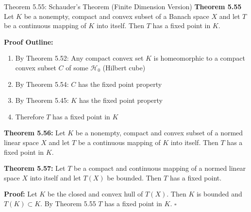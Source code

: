 \documentclass[aspectratio=169,10pt]{beamer}
\begin{document}
\begin{frame}[allowframebreaks]{Theorem 5.55: Schauder's Theorem (Finite Dimension Version)}
    \textbf{Theorem 5.55} Let $K$ be a nonempty, compact and convex subset of a Banach space $X$ and let $T$ be a continuous mapping of $K$ into itself. Then $T$ has a fixed point in $K$.

    \vspace{0.4cm}
    \textbf{Proof Outline:}

    \begin{enumerate}
        \item By Theorem 5.52: Any compact convex set $K$ is homeomorphic to a compact convex subset $C$ of some $\mathcal{H}_0$ (Hilbert cube)

        \item By Theorem 5.54: $C$ has the fixed point property

        \item By Theorem 5.45: $K$ has the fixed point property

        \item Therefore $T$ has a fixed point in $K$
    \end{enumerate}

    \framebreak

    \textbf{Theorem 5.56:} Let $K$ be a nonempty, compact and convex subset of a normed linear space $X$ and let $T$ be a continuous mapping of $K$ into itself. Then $T$ has a fixed point in $K$.

    \vspace{0.3cm}
    \textbf{Theorem 5.57:} Let $T$ be a compact and continuous mapping of a normed linear space $X$ into itself and let $T(X)$ be bounded. Then $T$ has a fixed point.

    \vspace{0.3cm}
    \textbf{Proof:} Let $K$ be the closed and convex hull of $T(X)$. Then $K$ is bounded and $T(K) \subset K$. By Theorem 5.55 $T$ has a fixed point in $K$. $\square$
\end{frame}
\end{document}
